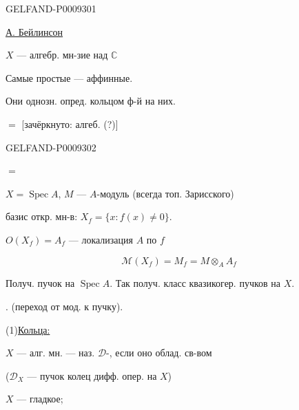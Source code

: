 \begin{GelfandAdjacentEvidence}{GELFAND-P000930}{1}

\underline{А. Бейлинсон}

$X$ --- алгебр. мн-зие над $\mathbb C$

Самые простые --- аффинные.

Они однозн. опред. кольцом ф-й на них.

 $=$ [зачёркнуто: алгеб. (?)] 
\end{GelfandAdjacentEvidence}
\begin{GelfandAdjacentEvidence}{GELFAND-P000930}{2}


 $=$ 

$X=\operatorname{Spec} A$, $M$ --- $A$-модуль (всегда топ. Зарисского)

базис откр. мн-в: \(X_f=\{x:f(x)\ne0\}\).

$O(X_f)=A_f$ --- локализация $A$ по $f$

\[
 \mathcal M(X_f)=M_f=M\otimes_A A_f
\]

Получ. пучок на $\operatorname{Spec} A$. Так получ. класс квазикогер. пучков на $X$.

. (переход от мод. к пучку).

(1)\quad \underline{Кольца:} 

$X$ --- алг. мн. --- наз. $\mathcal D$-, если оно облад. св-вом

($\mathcal D_X$ --- пучок колец дифф. опер. на $X$)

$X$ --- гладкое;
\end{GelfandAdjacentEvidence}

